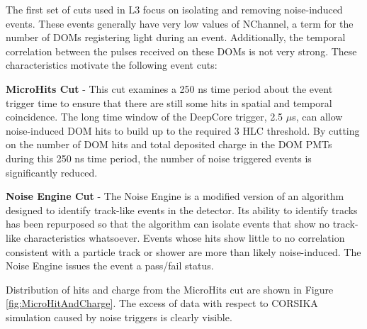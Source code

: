\documentclass{gatech-thesis}
\begin{document}
The first set of cuts used in L3 focus on isolating and removing noise-induced events. These events generally have very low values of NChannel, a term for the number of DOMs registering light during an event. Additionally, the temporal correlation between the pulses received on these DOMs is not very strong. These characteristics motivate the following event cuts:
\begin{adjustwidth}{2.5em}{2.5em}
\setlength{\parindent}{0pt}
\textbf{MicroHits Cut} - This cut examines a 250 ns time period about the event trigger time to ensure that there are still some hits in spatial and temporal coincidence. The long time window of the DeepCore trigger, 2.5 $\mu$s, can allow noise-induced DOM hits to build up to the required 3 HLC threshold. By cutting on the number of DOM hits and total deposited charge in the DOM PMTs during this 250 ns time period, the number of noise triggered events is significantly reduced.

\textbf{Noise Engine Cut} - The Noise Engine is a modified version of an algorithm designed to identify track-like events in the detector. Its ability to identify tracks has been repurposed so that the algorithm can isolate events that show no track-like characteristics whatsoever. Events whose hits show little to no correlation consistent with a particle track or shower are more than likely noise-induced. The Noise Engine issues the event a pass/fail status.
\end{adjustwidth}
\setlength{\parindent}{17.5pt}
Distribution of hits and charge from the MicroHits cut are shown in Figure \ref{fig:MicroHitAndCharge}. The excess of data with respect to CORSIKA simulation caused by noise triggers is clearly visible.
\end{document}
